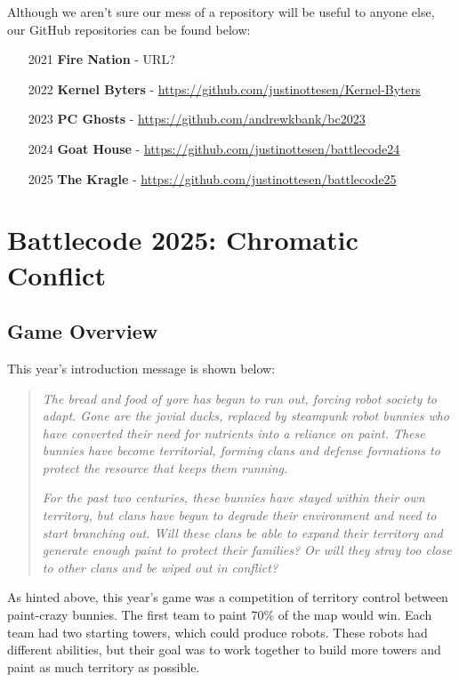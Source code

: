 \documentclass{article}
\begin{document}
  \medskip

  Although we aren't sure our mess of a repository will be useful to anyone else, our GitHub repositories can be found below:
  \begin{enumerate}
    \item[2021] \textbf{Fire Nation} - URL?
    \item[2022] \textbf{Kernel Byters} - \url{https://github.com/justinottesen/Kernel-Byters}
    \item[2023] \textbf{PC Ghosts} - \url{https://github.com/andrewkbank/bc2023}
    \item[2024] \textbf{Goat House} - \url{https://github.com/justinottesen/battlecode24}
    \item[2025] \textbf{The Kragle} - \url{https://github.com/justinottesen/battlecode25}
  \end{enumerate}

  \section{Battlecode 2025: Chromatic Conflict}

  \subsection{Game Overview}

  This year's introduction message is shown below:

  \begin{quote}
    \textit{The bread and food of yore has begun to run out, forcing robot society to adapt. Gone are the jovial ducks, replaced by steampunk robot bunnies who have converted their need for nutrients into a reliance on paint. These bunnies have become territorial, forming clans and defense formations to protect the resource that keeps them running.}
    
    \medskip
    
    \textit{For the past two centuries, these bunnies have stayed within their own territory, but clans have begun to degrade their environment and need to start branching out. Will these clans be able to expand their territory and generate enough paint to protect their families? Or will they stray too close to other clans and be wiped out in conflict?}
  \end{quote}

  As hinted above, this year's game was a competition of territory control between paint-crazy bunnies. The first team to paint 70\% of the map would win. Each team had two starting towers, which could produce robots. These robots had different abilities, but their goal was to work together to build more towers and paint as much territory as possible.
\end{document}
